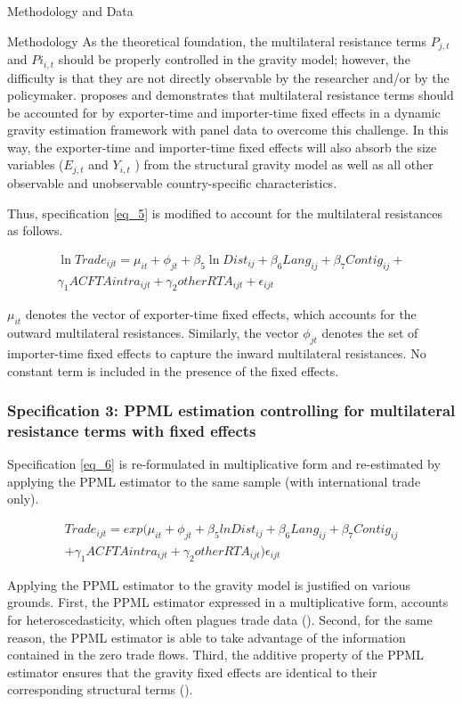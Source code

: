 \begin{section}{Methodology and Data }
\begin{subsection}{Methodology }
As the theoretical foundation, the multilateral resistance terms $P_{j,t}$ and $Pi_{i,t}$ should be properly controlled in the gravity model; however, the difficulty is that they are not directly observable by the researcher and/or by the policymaker. \cite{Feenstra2016} proposes and demonstrates that multilateral resistance terms should be accounted for by exporter-time and importer-time fixed effects in a dynamic gravity estimation framework with panel data to overcome this challenge. In this way, the exporter-time and importer-time fixed effects will also absorb the size variables ($E_{j,t}$ and $Y_{i,t}$ ) from the structural gravity model as well as all other observable and unobservable country-specific characteristics.

Thus, specification \ref{eq_5} is modified to account for the multilateral resistances as follows.

\begin{multline}\label{eq_6}
\ln{Trade_{ijt}} = \mu_{it} + \phi_{jt} + \beta_5 \ln{Dist_{ij}} + \beta_6 Lang_{ij} + \beta_7 Contig_{ij} + \\ \gamma_1 ACFTAintra_{ijt} + \gamma_2 otherRTA_{ijt} +  \epsilon_{ijt}
\end{multline}

$\mu_{it}$ denotes the vector of exporter-time fixed effects, which accounts for the outward multilateral resistances. Similarly, the vector $\phi_{jt}$ denotes the set of importer-time fixed effects to capture the inward multilateral resistances. No constant term is included in the presence of the fixed effects.


\subsubsection*{Specification 3: PPML estimation controlling for multilateral resistance terms with fixed effects}

Specification \ref{eq_6} is re-formulated in multiplicative form and re-estimated by applying the PPML estimator to the same sample (with international trade only).

\begin{multline}\label{eq_7}
Trade_{ijt} = exp \Big(\mu_{it} + \phi_{jt} + \beta_5 lnDist_{ij} + \beta_6 Lang_{ij} + \beta_7 Contig_{ij} \\ 
+ \gamma_1 ACFTAintra_{ijt} + \gamma_2 otherRTA_{ijt} \Big) \epsilon_{ijt}
\end{multline}

\bigskip
Applying the PPML estimator to the gravity model is justified on various grounds. First, the PPML estimator expressed in a multiplicative form, accounts for heteroscedasticity, which often plagues trade data (\cite{silva2006log}). Second, for the same reason, the PPML estimator is able to take advantage of the information contained in the zero trade flows. Third, the additive property of the PPML estimator ensures that the gravity fixed effects are identical to their corresponding structural terms (\cite{fally2015}).


\end{subsection}
\end{section}
